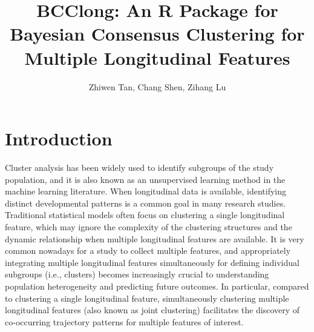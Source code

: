 
\title{BCClong: An R Package for Bayesian Consensus Clustering for Multiple Longitudinal Features}

\author{ Zhiwen Tan,  Chang Shen, Zihang Lu}

\maketitle


\section[Introduction]{Introduction} \label{sec:intro}

Cluster analysis has been widely used to identify subgroups of the study population, and it is also known as an unsupervised learning method in the machine learning literature. When longitudinal data is available, identifying distinct developmental patterns is a common goal in many research studies. Traditional statistical models often focus on clustering a single longitudinal feature, which may ignore the complexity of the clustering structures and the dynamic relationship when multiple longitudinal features are available. It is very common nowadays for a study to collect multiple features, and appropriately integrating multiple longitudinal features simultaneously for defining individual subgroups (i.e., clusters) becomes increasingly crucial to understanding population heterogeneity and predicting future outcomes. In particular, compared to clustering a single longitudinal feature, simultaneously clustering multiple longitudinal features (also known as joint clustering) facilitates the discovery of co-occurring trajectory patterns for multiple features of interest.

